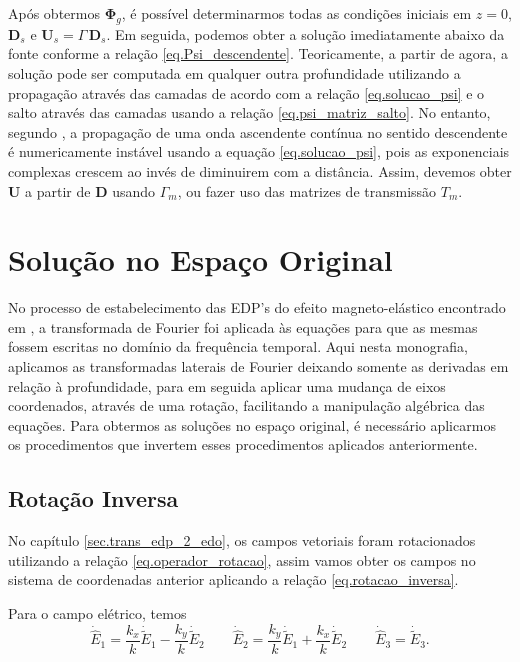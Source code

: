 Ap\'os obtermos $\mathbf{\Phi}_g$, \'e poss\'ivel determinarmos todas as condi\c{c}\~oes iniciais em $z=0$, $\mathbf{D}_s$ e $\mathbf{U}_s=\Gamma\,\mathbf{D}_s$. Em seguida, podemos obter a solu\c{c}\~ao imediatamente abaixo da fonte conforme a rela\c{c}\~ao \ref{eq.Psi_descendente}. Teoricamente, a partir de agora, a solu\c{c}\~ao pode ser computada em qualquer outra profundidade utilizando a propaga\c{c}\~ao atrav\'es das camadas de acordo com a rela\c{c}\~ao \ref{eq.solucao_psi} e o salto atrav\'es das camadas usando a rela\c{c}\~ao \ref{eq.psi_matriz_salto}. No entanto, segundo \cite{White_Zhou_2006}, a propaga\c{c}\~ao de uma onda ascendente cont\'inua no sentido descendente \'e numericamente inst\'avel usando a equa\c{c}\~ao \ref{eq.solucao_psi}, pois as exponenciais complexas crescem ao inv\'es de diminuirem com a dist\^ancia. Assim, devemos obter $\mathbf{U}$ a partir de $\mathbf{D}$ usando $\Gamma_m$, ou fazer uso das matrizes de transmiss\~ao $T_m$.

\section{Solu\c{c}\~ao no Espa\c{c}o Original}

No processo de estabelecimento das EDP's do efeito magneto-el\'astico encontrado em \cite{pinho_2018}, a transformada de Fourier foi aplicada \`as equa\c{c}\~oes para que as mesmas fossem escritas no dom\'inio da frequ\^encia temporal. Aqui nesta monografia, aplicamos as transformadas laterais de Fourier deixando somente as derivadas em rela\c{c}\~ao \`a profundidade, para em seguida aplicar uma mudan\c{c}a de eixos coordenados, atrav\'es de uma rota\c{c}\~ao, facilitando a manipula\c{c}\~ao alg\'ebrica das equa\c{c}\~oes. Para obtermos as solu\c{c}\~oes no espa\c{c}o original, \'e necess\'ario aplicarmos os procedimentos que invertem esses procedimentos aplicados anteriormente.

\subsection{Rota\c{c}\~ao Inversa}
No cap\'itulo \ref{sec.trans_edp_2_edo}, os campos vetoriais foram rotacionados utilizando a rela\c{c}\~ao \ref{eq.operador_rotacao}, assim vamos obter os campos no sistema de coordenadas anterior aplicando a rela\c{c}\~ao \ref{eq.rotacao_inversa}. 


Para o campo el\'etrico, temos
\begin{equation*}
\dot{\hat{E}}_1=\frac{k_x}{k}\dot{\tilde{E}}_1-\frac{k_y}{k}\dot{\tilde{E}}_2\qquad
\dot{\hat{E}}_2=\frac{k_y}{k}\dot{\tilde{E}}_1+\frac{k_x}{k}\dot{\tilde{E}}_2\qquad
\dot{\hat{E}}_3=\dot{\tilde{E}}_3.
\end{equation*}



